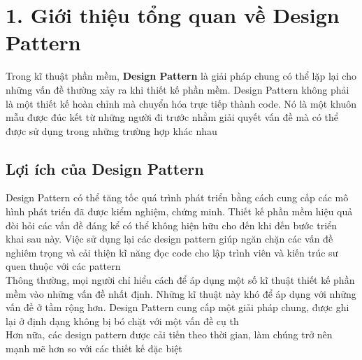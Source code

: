 
\chapter{1. Giới thiệu tổng quan về Design Pattern}
Trong kĩ thuật phần mềm, \textbf{Design Pattern} là giải pháp chung có thể lặp lại cho những vấn đề thường xảy ra khi thiết kế phần mềm. Design Pattern không phải là một thiết kế hoàn chỉnh mà chuyển hóa trực tiếp thành code. Nó là một khuôn mẫu được đúc kết từ những người đi trước nhằm giải quyết vấn đề mà có thể được sử dụng trong những trường hợp khác nhau

\section{Lợi ích của Design Pattern}
Design Pattern có thể tăng tốc quá trình phát triển bằng cách cung cấp các mô hình phát triển đã được kiểm nghiệm, chứng minh. Thiết kế phần mềm hiệu quả đòi hỏi các vấn đề đáng kể có thể không hiện hữu cho đến khi đến bước triển khai sau này. Việc sử dụng lại các design pattern giúp ngăn chặn các vấn đề nghiêm trọng và cải thiện kĩ năng đọc code cho lập trình viên và kiến trúc sư quen thuộc với các pattern\\[0.1in]
Thông thường, mọi người chỉ hiểu cách để áp dụng một số kĩ thuật thiết kế phần mềm vào những vấn đề nhất định. Những kĩ thuật này khó để áp dụng với những vấn đề ở tầm rộng hơn. Design Pattern cung cấp một giải pháp chung, được ghi lại ở định dạng không bị bó chặt với một vấn đề cụ th \\[0.1in]
Hơn nữa, các design pattern được cải tiến theo thời gian, làm chúng trở nên mạnh mẽ hơn so với các thiết kế đặc biệt

